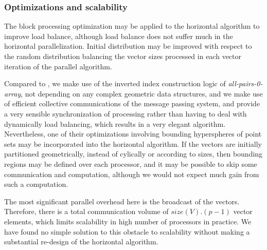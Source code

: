 \documentclass{comjnl}
\newcommand{\var}[1]{\mbox{\textsl{#1}}} %
\begin{document}
 


\subsubsection{Optimizations and scalability} 

The block processing optimization may be applied to the horizontal
algorithm to improve load balance, although load balance does not
suffer much in the horizontal parallelization. Initial distribution
may be improved with respect to the random distribution balancing the
vector sizes processed in each vector iteration of the parallel
algorithm. 

Compared to \cite{plaku-distknn}, we make use of the inverted index
construction logic of \var{all-pairs-0-array}, not depending on any complex
geometric data structures, and we make use of efficient collective
communications of the message passing system, and provide a very
sensible synchronization of processing rather than having to deal with
dynamically load balancing, which results in a very elegant
algorithm. 
Nevertheless, one of their optimizations
involving bounding hyperspheres of point sets may be incorporated into
the horizontal algorithm. If the vectors are initially partitioned
geometrically, instead of cylically or according to sizes, then
bounding regions may be defined over each processor, and it may be
possible to skip some communication and computation, although we would
not expect much gain from such a computation.

The most significant parallel overhead here is the broadcast of the
vectors. Therefore, there is a total communication volume of
$size(V).(p-1)$ vector elements,
which limits scalability in high number of processors in practice.  
We have found no simple solution to this obstacle to scalability
without making a substantial re-design of the horizontal
algorithm.
 
\end{document}
